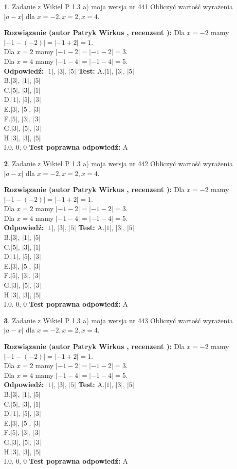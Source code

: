 \documentclass[12pt, a4paper]{article}
\theoremstyle{definition} %
\newtheorem{zad}{}
\newcommand{\zadStart}[1]{\begin{zad}#1\newline}
\newcommand{\zadStop}{\end{zad}}
\newcommand{\rozwStart}[2]{\noindent \textbf{Rozwiązanie (autor #1 , recenzent #2): }\newline}
\newcommand{\rozwStop}{\newline}
\newcommand{\odpStart}{\noindent \textbf{Odpowiedź:}\newline}
\newcommand{\odpStop}{\newline}
\newcommand{\testStart}{\noindent \textbf{Test:}\newline}
\newcommand{\testStop}{\newline}
\newcommand{\kluczStart}{\noindent \textbf{Test poprawna odpowiedź:}\newline}
\newcommand{\kluczStop}{\newline}
\begin{document}
\zadStart{Zadanie z Wikieł P 1.3 a) moja wersja nr 441}
Obliczyć wartość wyrażenia $|a - x|$ dla $x=-2,x=2,x=4$.
\zadStop
\rozwStart{Patryk Wirkus}{}
Dla $x = -2$ mamy $|-1 - (-2)| = |-1 + 2| = 1$.\\
Dla $x = 2$ mamy $|-1 - 2| = |-1 - 2| = 3$.\\
Dla $x = 4$ mamy $|-1 - 4| = |-1 - 4| = 5$.\\
\rozwStop
\odpStart
$|1|$, $|3|$, $|5|$
\odpStop
\testStart
A.$|1|$, $|3|$, $|5|$\\
B.$|3|$, $|1|$, $|5|$\\
C.$|5|$, $|3|$, $|1|$\\
D.$|1|$, $|5|$, $|3|$\\
E.$|3|$, $|5|$, $|3|$\\
F.$|5|$, $|3|$, $|3|$\\
G.$|3|$, $|5|$, $|3|$\\
H.$|3|$, $|3|$, $|5|$\\
I.$0$, $0$, $0$
\testStop
\kluczStart
A
\kluczStop



\zadStart{Zadanie z Wikieł P 1.3 a) moja wersja nr 442}
Obliczyć wartość wyrażenia $|a - x|$ dla $x=-2,x=2,x=4$.
\zadStop
\rozwStart{Patryk Wirkus}{}
Dla $x = -2$ mamy $|-1 - (-2)| = |-1 + 2| = 1$.\\
Dla $x = 2$ mamy $|-1 - 2| = |-1 - 2| = 3$.\\
Dla $x = 4$ mamy $|-1 - 4| = |-1 - 4| = 5$.\\
\rozwStop
\odpStart
$|1|$, $|3|$, $|5|$
\odpStop
\testStart
A.$|1|$, $|3|$, $|5|$\\
B.$|3|$, $|1|$, $|5|$\\
C.$|5|$, $|3|$, $|1|$\\
D.$|1|$, $|5|$, $|3|$\\
E.$|3|$, $|5|$, $|3|$\\
F.$|5|$, $|3|$, $|3|$\\
G.$|3|$, $|5|$, $|3|$\\
H.$|3|$, $|3|$, $|5|$\\
I.$0$, $0$, $0$
\testStop
\kluczStart
A
\kluczStop



\zadStart{Zadanie z Wikieł P 1.3 a) moja wersja nr 443}
Obliczyć wartość wyrażenia $|a - x|$ dla $x=-2,x=2,x=4$.
\zadStop
\rozwStart{Patryk Wirkus}{}
Dla $x = -2$ mamy $|-1 - (-2)| = |-1 + 2| = 1$.\\
Dla $x = 2$ mamy $|-1 - 2| = |-1 - 2| = 3$.\\
Dla $x = 4$ mamy $|-1 - 4| = |-1 - 4| = 5$.\\
\rozwStop
\odpStart
$|1|$, $|3|$, $|5|$
\odpStop
\testStart
A.$|1|$, $|3|$, $|5|$\\
B.$|3|$, $|1|$, $|5|$\\
C.$|5|$, $|3|$, $|1|$\\
D.$|1|$, $|5|$, $|3|$\\
E.$|3|$, $|5|$, $|3|$\\
F.$|5|$, $|3|$, $|3|$\\
G.$|3|$, $|5|$, $|3|$\\
H.$|3|$, $|3|$, $|5|$\\
I.$0$, $0$, $0$
\testStop
\kluczStart
A
\kluczStop
\end{document}
